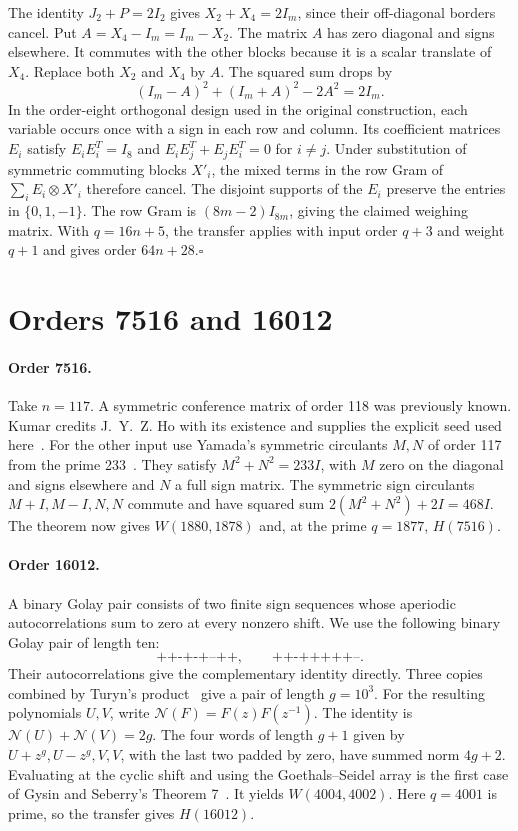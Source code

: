 \documentclass[10pt]{article}
\begin{document}
The identity $J_2+P=2I_2$ gives $X_2+X_4=2I_m$, since their off-diagonal borders cancel. Put $A=X_4-I_m=I_m-X_2$. The matrix $A$ has zero diagonal and signs elsewhere. It commutes with the other blocks because it is a scalar translate of $X_4$. Replace both $X_2$ and $X_4$ by $A$. The squared sum drops by
\[
 (I_m-A)^2+(I_m+A)^2-2A^2=2I_m.
\]
In the order-eight orthogonal design used in the original construction, each variable occurs once with a sign in each row and column. Its coefficient matrices $E_i$ satisfy $E_iE_i^T=I_8$ and $E_iE_j^T+E_jE_i^T=0$ for $i\ne j$. Under substitution of symmetric commuting blocks $X'_i$, the mixed terms in the row Gram of $\sum_i E_i\otimes X'_i$ therefore cancel. The disjoint supports of the $E_i$ preserve the entries in $\{0,1,-1\}$. The row Gram is $(8m-2)I_{8m}$, giving the claimed weighing matrix. With $q=16n+5$, the transfer applies with input order $q+3$ and weight $q+1$ and gives order $64n+28$.\hfill$\square$

\section{Orders 7516 and 16012}

\paragraph{Order 7516.}
Take $n=117$. A symmetric conference matrix of order 118 was previously known. Kumar credits J.~Y.~Z. Ho with its existence and supplies the explicit seed used here~\cite{kumar}. For the other input use Yamada's symmetric circulants $M,N$ of order 117 from the prime 233~\cite{yamada}. They satisfy $M^2+N^2=233I$, with $M$ zero on the diagonal and signs elsewhere and $N$ a full sign matrix. The symmetric sign circulants $M+I,M-I,N,N$ commute and have squared sum $2(M^2+N^2)+2I=468I$. The theorem now gives $W(1880,1878)$ and, at the prime $q=1877$, $H(7516)$.

\paragraph{Order 16012.}
A binary Golay pair consists of two finite sign sequences whose aperiodic autocorrelations sum to zero at every nonzero shift. We use the following binary Golay pair of length ten:
\[
 \texttt{++-+-+--++},\qquad \texttt{++-+++++--}.
\]
Their autocorrelations give the complementary identity directly. Three copies combined by Turyn's product~\cite{turyn} give a pair of length $g=10^3$. For the resulting polynomials $U,V$, write $\mathcal N(F)=F(z)F(z^{-1})$. The identity is $\mathcal N(U)+\mathcal N(V)=2g$. The four words of length $g+1$ given by $U+z^g,U-z^g,V,V$, with the last two padded by zero, have summed norm $4g+2$. Evaluating at the cyclic shift and using the Goethals--Seidel array is the first case of Gysin and Seberry's Theorem 7~\cite{gs}. It yields $W(4004,4002)$. Here $q=4001$ is prime, so the transfer gives $H(16012)$.
\end{document}
